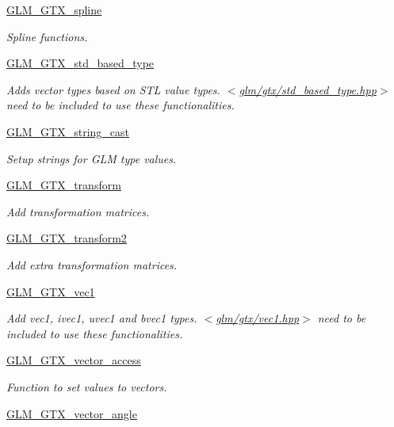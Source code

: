 \begin{DoxyCompactItemize}
\hyperlink{group__gtx__spline}{G\+L\+M\+\_\+\+G\+T\+X\+\_\+spline}
\begin{DoxyCompactList}\small\item\em Spline functions. \end{DoxyCompactList}\item 
\hyperlink{group__gtx__std__based__type}{G\+L\+M\+\_\+\+G\+T\+X\+\_\+std\+\_\+based\+\_\+type}
\begin{DoxyCompactList}\small\item\em Adds vector types based on S\+T\+L value types. $<$\hyperlink{std__based__type_8hpp}{glm/gtx/std\+\_\+based\+\_\+type.\+hpp}$>$ need to be included to use these functionalities. \end{DoxyCompactList}\item 
\hyperlink{group__gtx__string__cast}{G\+L\+M\+\_\+\+G\+T\+X\+\_\+string\+\_\+cast}
\begin{DoxyCompactList}\small\item\em Setup strings for G\+L\+M type values. \end{DoxyCompactList}\item 
\hyperlink{group__gtx__transform}{G\+L\+M\+\_\+\+G\+T\+X\+\_\+transform}
\begin{DoxyCompactList}\small\item\em Add transformation matrices. \end{DoxyCompactList}\item 
\hyperlink{group__gtx__transform2}{G\+L\+M\+\_\+\+G\+T\+X\+\_\+transform2}
\begin{DoxyCompactList}\small\item\em Add extra transformation matrices. \end{DoxyCompactList}\item 
\hyperlink{group__gtx__vec1}{G\+L\+M\+\_\+\+G\+T\+X\+\_\+vec1}
\begin{DoxyCompactList}\small\item\em Add vec1, ivec1, uvec1 and bvec1 types. $<$\hyperlink{vec1_8hpp}{glm/gtx/vec1.\+hpp}$>$ need to be included to use these functionalities. \end{DoxyCompactList}\item 
\hyperlink{group__gtx__vector__access}{G\+L\+M\+\_\+\+G\+T\+X\+\_\+vector\+\_\+access}
\begin{DoxyCompactList}\small\item\em Function to set values to vectors. \end{DoxyCompactList}\item 
\hyperlink{group__gtx__vector__angle}{G\+L\+M\+\_\+\+G\+T\+X\+\_\+vector\+\_\+angle}

\end{DoxyCompactItemize}
